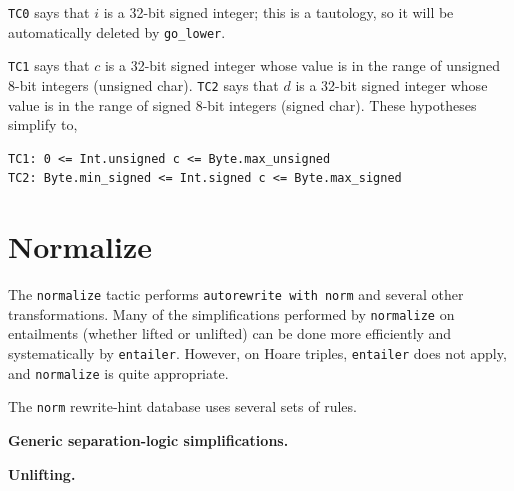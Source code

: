 \documentclass[12pt,fleqn,openany,oneside,showtrims]{memoir}
\begin{document}
\lstinline{TC0} says that $i$ is a 32-bit signed integer;
this is a tautology, so it will be automatically deleted by
\lstinline{go_lower}.

\lstinline{TC1} says that $c$ is a 32-bit signed integer
whose value is in the range of unsigned 8-bit integers
(unsigned char).
\lstinline{TC2} says that $d$ is a 32-bit signed integer
whose value is in the range of signed 8-bit integers
(signed char).
These hypotheses simplify to,
\begin{lstlisting}
TC1: 0 <= Int.unsigned c <= Byte.max_unsigned
TC2: Byte.min_signed <= Int.signed c <= Byte.max_signed
\end{lstlisting}

\chapter{Normalize}
The \lstinline{normalize} tactic performs
\lstinline{autorewrite with norm} and several other transformations.
Many of the simplifications performed by \lstinline{normalize}
on entailments (whether lifted or unlifted)
can be done more efficiently and systematically by
\lstinline{entailer}.  However, on Hoare triples, \lstinline{entailer}
does not apply, and \lstinline{normalize} is quite appropriate.

The \lstinline{norm} rewrite-hint database uses several sets of rules.

\textbf{Generic separation-logic simplifications.}

\textbf{Unlifting.}
\end{document}
